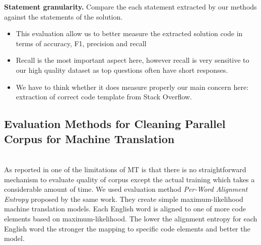 \textbf{Statement granularity.}
Compare the each statement extracted by our methods against the statements of the solution.
\begin{itemize} 
	\item This evaluation allow us to better measure the extracted solution code in terms of accuracy, F1, precision and recall
    \item Recall is the most important aspect here, however recall is very sensitive to our high quality dataset as top questions often have short responses. 
    \item We have to think whether it does measure properly our main concern here: extraction of correct code template from Stack Overflow.
\end{itemize}

\subsection{Evaluation Methods for Cleaning Parallel Corpus for Machine Translation}
\\
As reported in \cite{Rahman:2019_CleaningStackOverflowforMT} one of the limitations of MT is that there is no straightforward mechanism to evaluate quality of corpus except the actual training which takes a considerable amount of time. We used evaluation method \textit{Per-Word Alignment Entropy} proposed by the same work. They create simple maximum-likelihood machine translation models. Each English word is aligned to one of more code elements based on maximum-likelihood. The lower the alignment entropy for each English word the stronger the mapping to specific code elements and better the model.






